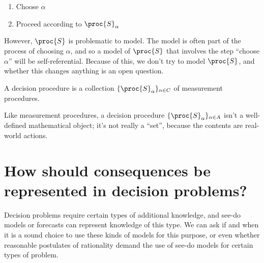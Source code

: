 \begin{enumerate}
    \item Choose $\alpha$
    \item Proceed according to $\proc{S}_\alpha$
\end{enumerate}

However, $\proc{S}$ is problematic to model. The model is often part of the process of choosing $\alpha$, and so a model of $\proc{S}$ that involves the step ``choose $\alpha$'' will be self-referential. Because of this, we don't try to model $\proc{S}$, and whether this changes anything is an open question.

\begin{definition}
A decision procedure is a collection $\{\proc{S}_\alpha\}_{\alpha\in C}$ of measurement procedures.
\end{definition}

Like measurement procedures, a decision procedure $\{\proc{S}_\alpha\}_{\alpha\in A}$ isn't a well-defined mathematical object; it's not really a ``set'', because the contents are real-world actions.

\section{How should consequences be represented in decision problems?}\label{sec:how_represent_conseqeunces}

Decision problems require certain types of additional knowledge, and see-do models or forecasts can represent knowledge of this type. We can ask if and when it is a sound choice to use these kinds of models for this purpose, or even whether reasonable postulates of rationality demand the use of see-do models for certain types of problem.

